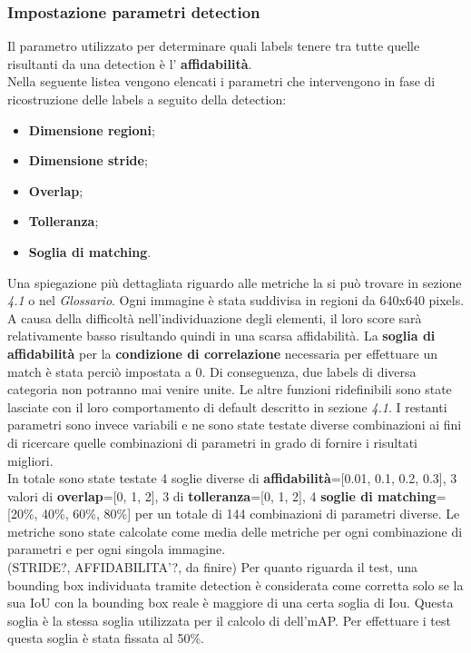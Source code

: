 \subsubsection{Impostazione parametri detection}
Il parametro utilizzato per determinare quali labels tenere tra tutte quelle risultanti da una detection è
l' \textbf{affidabilità}.\\
Nella seguente listea vengono elencati i parametri che intervengono in fase di ricostruzione delle labels a seguito della detection:
\begin{itemize}
\item \textbf{Dimensione regioni};
\item \textbf{Dimensione stride};
\item \textbf{Overlap};
\item \textbf{Tolleranza};
\item \textbf{Soglia di matching}.
\end{itemize}
Una spiegazione più dettagliata riguardo alle metriche la si può trovare in sezione \textit{4.1} o nel \textit{Glossario}.
Ogni immagine è stata suddivisa in regioni da 640x640 pixels. A causa della difficoltà nell'individuazione degli elementi, il loro score sarà relativamente basso risultando quindi in una scarsa affidabilità. La \textbf{soglia di affidabilità} per la \textbf{condizione di correlazione} necessaria per effettuare un match è stata perciò impostata a 0. Di conseguenza, due labels di diversa categoria non potranno mai venire unite. Le altre funzioni ridefinibili sono state lasciate con il loro comportamento di default descritto in sezione \textit{4.1}. I restanti parametri sono invece variabili e ne sono state testate diverse combinazioni ai fini di ricercare quelle combinazioni di parametri in grado di fornire i risultati migliori.
\\
In totale sono state testate 4 soglie diverse di \textbf{affidabilità}=[0.01, 0.1, 0.2, 0.3], 3 valori di \textbf{overlap}=[0, 1, 2], 3 di \textbf{tolleranza}=[0, 1, 2], 4 \textbf{soglie di matching}=[20\%, 40\%, 60\%, 80\%] per un totale di 144 combinazioni di parametri diverse. Le metriche sono state calcolate come media delle metriche per ogni combinazione di parametri e per ogni singola immagine.\\
(STRIDE?, AFFIDABILITA'?, da finire)
Per quanto riguarda il test, una bounding box individuata tramite detection è considerata come corretta solo se la sua IoU con la bounding box reale è maggiore di una certa soglia di Iou. Questa soglia è la stessa soglia utilizzata per il calcolo di dell'mAP. Per effettuare i test questa soglia è stata fissata al 50\%.

